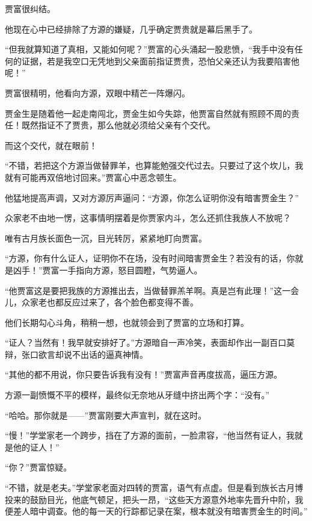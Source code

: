 
\begin{this_body}



贾富很纠结。

他现在心中已经排除了方源的嫌疑，几乎确定贾贵就是幕后黑手了。

“但我就算知道了真相，又能如何呢？”贾富的心头涌起一股悲愤，“我手中没有任何的证据，若是我空口无凭地到父亲面前指证贾贵，恐怕父亲还认为我要陷害他呢！”

贾富很精明，他看向方源，双眼中精芒一阵爆闪。

贾金生是随着他一起走南闯北，贾金生如今失踪，他贾富自然就有照顾不周的责任！既然指证不了贾贵，那么他就必须给父亲有个交代。

而这个交代，就在眼前！

“不错，若把这个方源当做替罪羊，也算能勉强交代过去。只要过了这个坎儿，我就有可能再双倍地讨回来。”贾富心中恶念顿生。

他猛地提高声调，又对方源厉声逼问：“方源，你怎么证明你没有暗害贾金生？”

众家老不由地一愣，这事情明摆着是你贾家内斗，怎么还抓住我族人不放呢？

唯有古月族长面色一沉，目光转厉，紧紧地盯向贾富。

“方源，你有什么证人，证明你不在场，没有时间暗害贾金生？若没有的话，你就是凶手！”贾富一手指向方源，怒目圆瞪，气势逼人。

“他贾富这是要把我族的方源推出去，当做替罪羔羊啊。真是岂有此理！”这一会儿，众家老也都反应过来了，各个脸色都变得不善。

他们长期勾心斗角，稍稍一想，也就领会到了贾富的立场和打算。

“证人？当然有！我早就安排好了。”方源暗自一声冷笑，表面却作出一副百口莫辩，张口欲言却说不出话的逼真神情。

“其他的都不用说，你只要告诉我有没有！”贾富声音再度拔高，逼压方源。

方源一副愤慨不平的模样，最终似无奈地从牙缝中挤出两个字：“没有。”

“哈哈。那你就是——”贾富刚要大声宣判，就在这时。

“慢！”学堂家老一个跨步，挡在了方源的面前，一脸肃容，“他当然有证人，我就是他的证人！”

“你？”贾富惊疑。

“不错，就是老夫。”学堂家老面对四转的贾富，语气有点虚。但是看到族长古月博投来的鼓励目光，他底气顿足，把头一昂，“这些天方源意外地率先晋升中阶，我便差人暗中调查。他的每一天的行踪都记录在案，根本就没有暗害贾金生的时间。”


\end{this_body}
